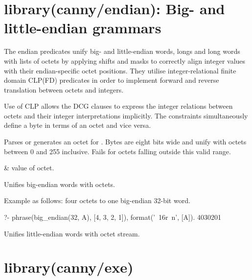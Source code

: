 \chapter{library(canny/endian): Big- and little-endian grammars}\label{sec:endian}

The endian predicates unify big- and little-endian words, longs and
long words with lists of octets by applying shifts and masks to
correctly align integer values with their endian-specific octet
positions. They utilise integer-relational finite domain CLP(FD)
predicates in order to implement forward and reverse translation
between octets and integers.

Use of CLP allows the DCG clauses to express the integer relations
between octets and their integer interpretations implicitly. The
constraints simultaneously define a byte in terms of an octet and
vice versa.\vspace{0.7cm}

\begin{description}
Parses or generates an octet for . Bytes are eight bits wide and
unify with octets between 0 and 255 inclusive. Fails for octets
falling outside this valid range.

\begin{arguments}
 & value of octet. \\
\end{arguments}

Unifies big-endian words with octets.

Example as follows: four octets to one big-endian 32-bit word.

\begin{code}
?- phrase(big_endian(32, A), [4, 3, 2, 1]),
   format('~16r~n', [A]).
4030201
\end{code}

Unifies little-endian words with octet stream.
\end{description}

\chapter{library(canny/exe)}\label{sec:exe}

